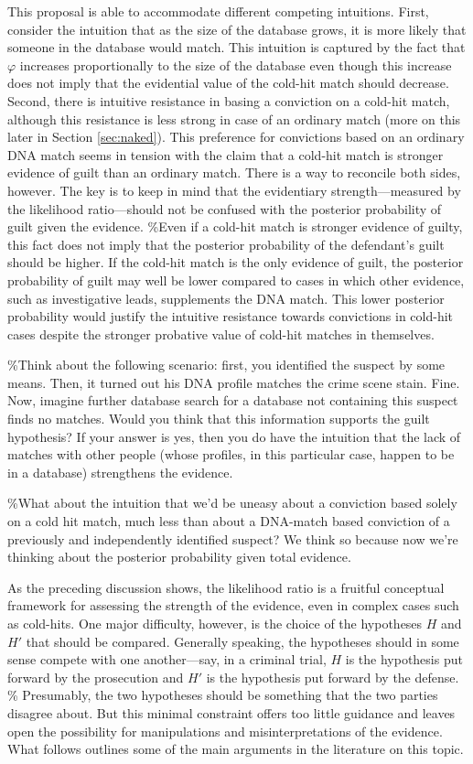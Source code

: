 \documentclass[10pt,dvipsnames,enabledeprecatedfontcommands]{scrartcl}
\begin{document}
This proposal is able to accommodate different competing intuitions.
First, consider the intuition that as the size of the database grows, it
is more likely that someone in the database would match. This intuition
is captured by the fact that \(\varphi\) increases proportionally to the
size of the database even though this increase does not imply that the
evidential value of the cold-hit match should decrease. Second, there is
intuitive resistance in basing a conviction on a cold-hit match,
although this resistance is less strong in case of an ordinary match
(more on this later in Section \ref{sec:naked}). This preference for
convictions based on an ordinary DNA match seems in tension with the
claim that a cold-hit match is stronger evidence of guilt than an
ordinary match. There is a way to reconcile both sides, however. The key
is to keep in mind that the evidentiary strength---measured by the
likelihood ratio---should not be confused with the posterior probability
of guilt given the evidence. \%Even if a cold-hit match is stronger
evidence of guilty, this fact does not imply that the posterior
probability of the defendant's guilt should be higher. If the cold-hit
match is the only evidence of guilt, the posterior probability of guilt
may well be lower compared to cases in which other evidence, such as
investigative leads, supplements the DNA match. This lower posterior
probability would justify the intuitive resistance towards convictions
in cold-hit cases despite the stronger probative value of cold-hit
matches in themselves.

\%Think about the following scenario: first, you identified the suspect
by some means. Then, it turned out his DNA profile matches the crime
scene stain. Fine. Now, imagine further database search for a database
not containing this suspect finds no matches. Would you think that this
information supports the guilt hypothesis? If your answer is yes, then
you do have the intuition that the lack of matches with other people
(whose profiles, in this particular case, happen to be in a database)
strengthens the evidence.

\%What about the intuition that we'd be uneasy about a conviction based
solely on a cold hit match, much less than about a DNA-match based
conviction of a previously and independently identified suspect? We
think so because now we're thinking about the posterior probability
given total evidence.

As the preceding discussion shows, the likelihood ratio is a fruitful
conceptual framework for assessing the strength of the evidence, even in
complex cases such as cold-hits. One major difficulty, however, is the
choice of the hypotheses \(H\) and \(H'\) that should be compared.
Generally speaking, the hypotheses should in some sense compete with one
another---say, in a criminal trial, \(H\) is the hypothesis put forward
by the prosecution and \(H'\) is the hypothesis put forward by the
defense. \% Presumably, the
two hypotheses should be something that the two parties disagree about.
But this minimal constraint offers too little guidance and leaves open
the possibility for manipulations and misinterpretations of the
evidence. What follows outlines some of the main arguments in the
literature on this topic.
\end{document}
